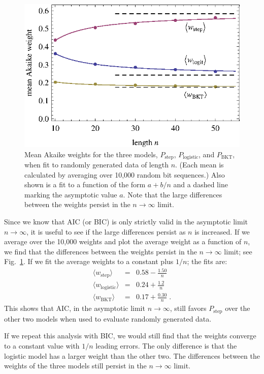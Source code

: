 \documentclass{edm_template}
\begin{document}
\begin{figure}
   \centering\includegraphics{mean-weights.eps}
  \caption{Mean Akaike weights for the three models, 
   $P_\mathrm{step}$, $P_\mathrm{logistic}$, and $P_\mathrm{BKT}$, 
   when fit to randomly generated data of length $n$.
   (Each mean is calculated by averaging over 10,000 random bit sequences.)
   Also shown is a fit to a function of the form $a+b/n$ and
   a dashed line marking the asymptotic value $a$.
   Note that the large differences between the weights persist
   in the $n\to\infty$ limit.}\label{meanweight}
\end{figure}

Since we know that AIC (or BIC) is only strictly valid in
the asymptotic limit $n\to\infty$, it is useful to see if
the large differences persist as $n$ is increased.
If we average over the 10,000 weights and plot the average weight 
as a function of $n$, we find
that the differences between the weights persist
in the $n\to\infty$ limit;  see Fig.~\ref{meanweight}.
If we fit the average weights to a constant plus $1/n$;
the fits are:
%
\begin{eqnarray}
 \langle w_\mathrm{step}\rangle &=& 0.58 - \frac{1.50}{n} \\
 \langle w_\mathrm{logistic}\rangle &=& 0.24 + \frac{1.2}{n} \\
 \langle w_\mathrm{BKT}\rangle &=& 0.17+\frac{0.30}{n} \; .
\end{eqnarray}
%
This shows that AIC, in the asymptotic limit $n\to\infty$, 
still favors  $P_\mathrm{step}$ over the other two models
when used to evaluate randomly generated data.

If we repeat this analysis with BIC, we would still
find that the weights converge to a constant value with 
$1/n$ leading errors.  The only difference is that the logistic
model has a larger weight than the other two. 
The differences between the weights of the three models still persist
in the $n\to\infty$ limit.
\end{document}
